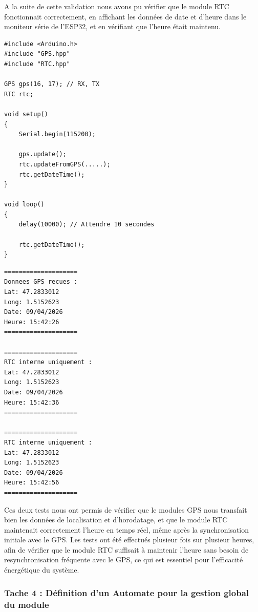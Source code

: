 A la suite de cette validation nous avons pu vérifier que le module RTC fonctionnait correctement, en affichant 
les données de date et d'heure dans le moniteur série de l'ESP32, et en vérifiant que l'heure était maintenu.
\\

\noindent
\begin{minipage}[t]{0.45\textwidth}
\begin{lstlisting}[style=CStyle, caption={Exemple utilisation module GPS + module RTC}, label={lst:gps_rtc_exemple}]
#include <Arduino.h>
#include "GPS.hpp"
#include "RTC.hpp"

GPS gps(16, 17); // RX, TX
RTC rtc;

void setup()
{
    Serial.begin(115200);

    gps.update();
    rtc.updateFromGPS(.....);
    rtc.getDateTime();
}

void loop()
{
    delay(10000); // Attendre 10 secondes 

    rtc.getDateTime();
}
\end{lstlisting}
\end{minipage}
\hfill
\begin{minipage}[t]{0.45\textwidth}
\begin{lstlisting}[style=CStyle, caption={Moniteur Série de l'ESP32}, label={lst:moniteur_exemple}]
====================
Donnees GPS recues :
Lat: 47.2833012
Long: 1.5152623
Date: 09/04/2026
Heure: 15:42:26
====================

====================
RTC interne uniquement :
Lat: 47.2833012
Long: 1.5152623
Date: 09/04/2026
Heure: 15:42:36
====================

====================
RTC interne uniquement :
Lat: 47.2833012
Long: 1.5152623
Date: 09/04/2026
Heure: 15:42:56
====================
\end{lstlisting}
\end{minipage}

Ces deux tests nous ont permis de vérifier que le modules GPS nous transfait bien les données de localisation et d'horodatage,
et que le module RTC maintenait correctement l'heure en temps réel, même après la synchronisation initiale avec le GPS.
Les tests ont été effectués plusieur fois sur plusieur heures, afin de vérifier que le module RTC suffisait à maintenir l'heure 
sans besoin de resynchronisation fréquente avec le GPS, ce qui est essentiel pour l'efficacité énergétique du système.
\\

\subsubsection{Tache 4 : Définition d'un Automate pour la gestion global du module}

